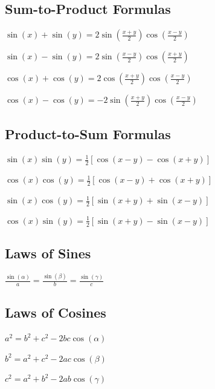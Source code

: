 \subsection*{Sum-to-Product Formulas}
\begin{eqlist}
	\item $\sin(x) + \sin(y) = 2\sin\left(\frac{x+y}{2}\right)\cos\left(\frac{x-y}{2}\right)$
	\item $\sin(x) - \sin(y) = 2\sin\left(\frac{x-y}{2}\right)\cos\left(\frac{x+y}{2}\right)$
	\item $\cos(x) + \cos(y) = 2\cos\left(\frac{x+y}{2}\right)\cos\left(\frac{x-y}{2}\right)$
	\item $\cos(x) - \cos(y) = -2\sin\left(\frac{x+y}{2}\right)\cos\left(\frac{x-y}{2}\right)$
\end{eqlist}

\subsection*{Product-to-Sum Formulas}
\begin{eqlist}
	\item $\sin(x)\sin(y) = \frac{1}{2}\left[\cos(x-y)-\cos(x+y)\right]$
	\item $\cos(x)\cos(y) = \frac{1}{2}\left[\cos(x-y)+\cos(x+y)\right]$
	\item $\sin(x)\cos(y) = \frac{1}{2}\left[\sin(x+y)+\sin(x-y)\right]$
	\item $\cos(x)\sin(y) = \frac{1}{2}\left[\sin(x+y)-\sin(x-y)\right]$
\end{eqlist}


\subsection*{Laws of Sines}
\begin{eqlist}
	\item $\frac{\sin(\alpha)}{a} = \frac{\sin(\beta)}{b} = \frac{\sin(\gamma)}{c}$
\end{eqlist}

\subsection*{Laws of Cosines}
\begin{eqlist}
	\item $a^2 = b^2 + c^2 - 2bc\cos(\alpha)$
	\item $b^2 = a^2 + c^2 - 2ac\cos(\beta)$
	\item $c^2 = a^2 + b^2 - 2ab\cos(\gamma)$
\end{eqlist}

